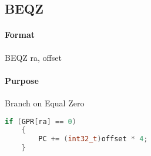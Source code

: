 \subsection{BEQZ}


\paragraph{Format} BEQZ ra, offset

\paragraph{Purpose} Branch on Equal Zero

\begin{lstlisting}[language=c]
    if (GPR[ra] == 0)
    {
        PC += (int32_t)offset * 4;
    }
\end{lstlisting}

